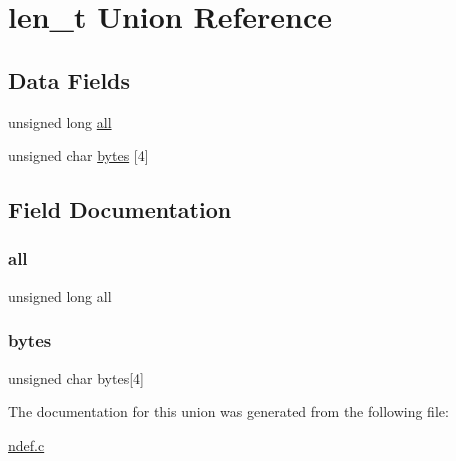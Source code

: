 \hypertarget{unionlen__t}{}\section{len\+\_\+t Union Reference}
\label{unionlen__t}
\subsection*{Data Fields}
\begin{DoxyCompactItemize}
\item 
unsigned long \mbox{\hyperlink{unionlen__t_a498cc0bdfa390f211219d90fa56ff062}{all}}
\item 
unsigned char \mbox{\hyperlink{unionlen__t_a9b23cefaea8f1ce883f08a5a4f94f740}{bytes}} \mbox{[}4\mbox{]}
\end{DoxyCompactItemize}


\subsection{Field Documentation}
\mbox{\label{unionlen__t_a498cc0bdfa390f211219d90fa56ff062}} 
\subsubsection{\texorpdfstring{all}{all}}
{\footnotesize\ttfamily unsigned long all}

\mbox{\label{unionlen__t_a9b23cefaea8f1ce883f08a5a4f94f740}} 
\subsubsection{\texorpdfstring{bytes}{bytes}}
{\footnotesize\ttfamily unsigned char bytes\mbox{[}4\mbox{]}}



The documentation for this union was generated from the following file\+:\begin{DoxyCompactItemize}
\item 
\mbox{\hyperlink{ndef_8c}{ndef.\+c}}\end{DoxyCompactItemize}
